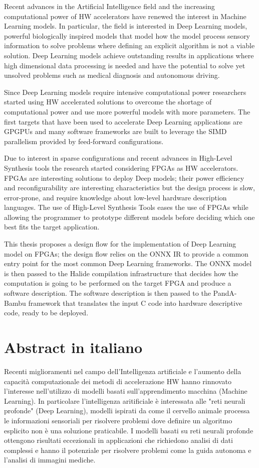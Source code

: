 \documentclass[11pt, a4paper, twoside, openright]{report}
\begin{document}
Recent advances in the Artificial Intelligence field and the increasing computational power of HW accelerators have renewed the interest in Machine Learning models.
In particular, the field is interested in Deep Learning models, powerful biologically inspired models that model how the model process sensory information to solve problems where defining an explicit algorithm is not a viable solution. 
Deep Learning models achieve outstanding results in applications where high dimensional data processing is needed and have the potential to solve yet unsolved problems such as medical diagnosis and autonomous driving.

Since Deep Learning models require intensive computational power researchers started using HW accelerated solutions to overcome the shortage of computational power and use more powerful models with more parameters.
The first targets that have been used to accelerate Deep Learning applications are GPGPUs and many software frameworks are built to leverage the SIMD parallelism provided by feed-forward configurations.

Due to interest in sparse configurations and recent advances in High-Level Synthesis tools the research started considering FPGAs as HW accelerators. 
FPGAs are interesting solutions to deploy Deep models; their power efficiency and reconfigurability are interesting characteristics but the design process is slow, error-prone, and require knowledge about low-level hardware description languages.
The use of High-Level Synthesis Tools eases the use of FPGAs while allowing the programmer to prototype different models before deciding which one best fits the target application.

This thesis proposes a design flow for the implementation of Deep Learning model on FPGAs; the design flow relies on the ONNX IR to provide a common entry point for the most common Deep Learning frameworks.
The ONNX model is then passed to the Halide compilation infrastructure that decides how the computation is going to be performed on the target FPGA and produce a software description.
The software description is then passed to the PandA-Bambu framework that translates the input C code into hardware descriptive code, ready to be deployed.
\newpage

\section*{Abstract in italiano}

Recenti miglioramenti nel campo dell'Intelligenza artificiale e l'aumento della capacità computazionale dei metodi di accelerazione HW hanno rinnovato l'interesse nell'utilizzo di modelli basati sull'apprendimento macchina (Machine Learning).
In particolare l'intelligenza aritificiale è interessata alle "reti neurali profonde" (Deep Learning), modelli ispirati da come il cervello animale processa le informazioni sensoriali per risolvere problemi dove definire un algoritmo esplicito non è una soluzione praticabile.
I modelli basati su reti neurali profonde ottengono risultati eccezionali in applicazioni che richiedono analisi di dati complessi e hanno il potenziale per risolvere problemi come la guida autonoma e l'analisi di immagini mediche.
\end{document}

